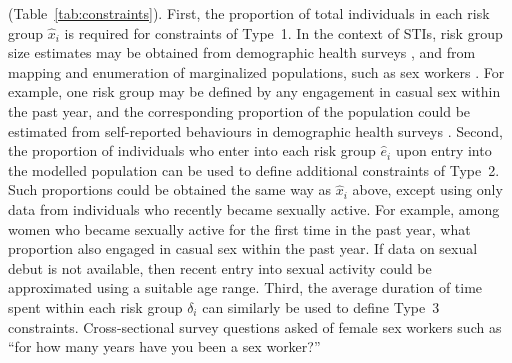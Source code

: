 (Table~\ref{tab:constraints}).
First, the proportion of total individuals in each risk group $\hat{x}_i$ is required
for constraints of Type~1.
In the context of STIs, risk group size estimates may be obtained from
demographic health surveys \citep{DHS}, and from
mapping and enumeration of marginalized populations,
such as sex workers \citep{Abdul-Quader2014}.
For example, one risk group may be defined by
any engagement in casual sex within the past year,
and the corresponding proportion of the population
could be estimated from self-reported behaviours
in demographic health surveys \citep{DHS}.
Second, the proportion of individuals who enter into each risk group $\hat{e}_i$
upon entry into the modelled population can be used to define additional constraints of Type~2.
Such proportions could be obtained the same way as $\hat{x}_i$ above,
except using only data from individuals who recently became sexually active.
For example, among women who became sexually active for the first time in the past year,
what proportion also engaged in casual sex within the past year.
If data on sexual debut is not available,
then recent entry into sexual activity could be approximated using
a suitable age range.
Third, the average duration of time spent within each risk group $\delta_i$
can similarly be used to define Type~3 constraints.
Cross-sectional survey questions asked of female sex workers such as
``for how many years have you been a sex worker?''\ %
